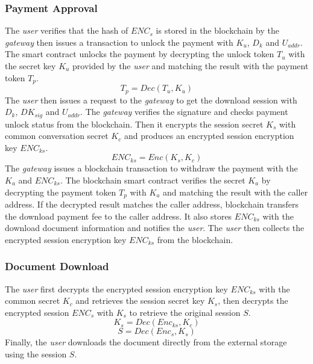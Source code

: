 \subsubsection{Payment Approval}
The {\it user} verifies that the hash of $ENC_s$ is stored in the blockchain by the {\it gateway} then issues a transaction to unlock the payment with $K_u$, $D_k$ and $U_{addr}$. The smart contract unlocks the payment by decrypting the unlock token $T_u$ with the secret key $K_u$ provided by the {\it user} and matching the result with the payment token $T_p$. 
\begin{equation}
\label{eq-d-6} 
T_p = Dec (T_u, K_u)
\end{equation}
The {\it user} then issues a request to the {\it gateway} to get the download session with $D_k$, $DK_{sig}$ and $U_{addr}$. The {\it gateway} verifies the signature and checks payment unlock status from the  blockchain. Then it encrypts the session secret $K_s$ with common conversation secret $K_c$ and produces an encrypted session encryption key $ENC_{ks}$.
\begin{equation}
\label{eq-d-7} 
ENC_{ks} = Enc (K_s, K_c)
\end{equation}
The {\it gateway} issues a blockchain transaction to withdraw the payment with the $K_a$ and $ENC_{ks}$. The blockchain smart contract verifies the secret $K_a$ by decrypting the payment token $T_p$ with $K_a$ and matching the result with the caller address. If the decrypted result matches the caller address, blockchain transfers the download payment fee to the caller address. It also stores $ENC_{ks}$ with the download document information and notifies the {\it user}. The {\it user} then collects the encrypted session encryption key $ENC_{ks}$ from the blockchain.

\subsubsection{Document Download}
The {\it user} first decrypts the encrypted session encryption key $ENC_{ks}$ with the common secret $K_c$ and retrieves the session secret key $K_s$, then decrypts the encrypted session $ENC_s$ with $K_s$ to retrieve the original session $S$.
\begin{equation}
\label{eq-d-8} 
K_s = Dec (Enc_{ks}, K_c)
\end{equation}
\begin{equation}
\label{eq-d-9} 
S = Dec (Enc_s, K_s)
\end{equation}
Finally, the {\it user} downloads the document directly from the external storage using the session $S$.

